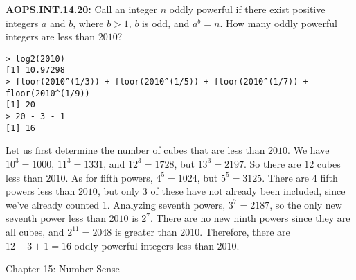 \documentclass[11pt]{article}
\newenvironment{uzdevums}[1][\unskip]{%
\vspace{3mm}
\noindent
\textbf{#1:}
\noindent}
{}
\begin{document}
\begin{uzdevums}[AOPS.INT.14.20]
Call an integer $n$ oddly powerful if there exist positive integers $a$ and $b$, where $b>1$, $b$ is odd, and $a^b = n$. How many oddly powerful integers are less than $2010$?
\end{uzdevums}

\begin{verbatim}
> log2(2010)
[1] 10.97298
> floor(2010^(1/3)) + floor(2010^(1/5)) + floor(2010^(1/7)) + floor(2010^(1/9))
[1] 20
> 20 - 3 - 1
[1] 16
\end{verbatim}


Let us first determine the number of cubes that are less than $2010$. We have $10^3 = 1000$, $11^3 = 1331$, and $12^3 = 1728$, but $13^3 = 2197$. So there are $12$ cubes less than $2010$. As for fifth powers, $4^5 = 1024$, but $5^5 = 3125$. There are $4$ fifth powers less than $2010$, but only $3$ of these have not already been included, since we've already counted 1. Analyzing seventh powers, $3^7 = 2187$, so the only new seventh power less than $2010$ is $2^7$. There are no new ninth powers since they are all cubes, and $2^{11} = 2048$ is greater than 2010. Therefore, there are $12+3+1 = \boxed{16}$ oddly powerful integers less than $2010$.




\vspace{30px}
\begin{center}
{\large Chapter 15: Number Sense}
\end{center}
\end{document}
